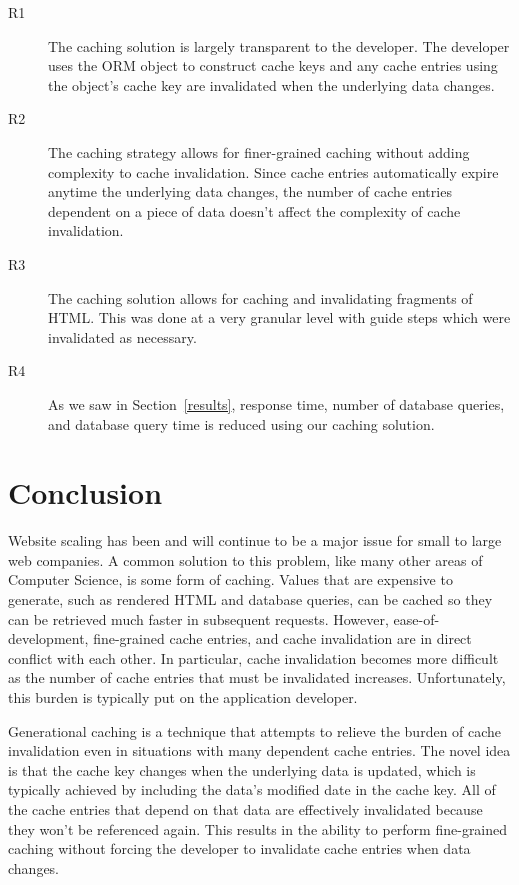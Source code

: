 \documentclass[12pt]{ucthesis}
\begin{document}
\begin{description}
   \item[R1] The caching solution is largely transparent to the developer.
             The developer uses the ORM object to construct cache keys and any cache entries using the object's cache key are invalidated when the underlying data changes.
   \item[R2] The caching strategy allows for finer-grained caching without adding complexity to cache invalidation.
             Since cache entries automatically expire anytime the underlying data changes, the number of cache entries dependent on a piece of data doesn't affect the complexity of cache invalidation.
   \item[R3] The caching solution allows for caching and invalidating fragments of HTML\@.
             This was done at a very granular level with guide steps which were invalidated as necessary.
   \item[R4] As we saw in Section~\ref{results}, response time, number of database queries, and database query time is reduced using our caching solution.
\end{description}


\chapter{Conclusion} \label{conclusion}
Website scaling has been and will continue to be a major issue for small to large web companies.
A common solution to this problem, like many other areas of Computer Science, is some form of caching.
Values that are expensive to generate, such as rendered HTML and database queries, can be cached so they can be retrieved much faster in subsequent requests.
However, ease-of-development, fine-grained cache entries, and cache invalidation are in direct conflict with each other.
In particular, cache invalidation becomes more difficult as the number of cache entries that must be invalidated increases.
Unfortunately, this burden is typically put on the application developer.

Generational caching is a technique that attempts to relieve the burden of cache invalidation even in situations with many dependent cache entries.
The novel idea is that the cache key changes when the underlying data is updated, which is typically achieved by including the data's modified date in the cache key.
All of the cache entries that depend on that data are effectively invalidated because they won't be referenced again.
This results in the ability to perform fine-grained caching without forcing the developer to invalidate cache entries when data changes.
\end{document}
